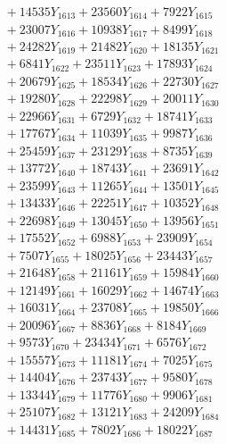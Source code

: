 \documentclass[a4paper,10pt]{article}
\begin{document}
{\begin{align}
&\;  + 14535 Y_{1613} + 23560 Y_{1614} + 7922 Y_{1615} \\[0.3ex]
&\;  + 23007 Y_{1616} + 10938 Y_{1617} + 8499 Y_{1618} \\[0.5ex]\allowbreak
&\;  + 24282 Y_{1619} + 21482 Y_{1620} + 18135 Y_{1621} \\[0.3ex]
&\;  + 6841 Y_{1622} + 23511 Y_{1623} + 17893 Y_{1624} \\[0.3ex]
&\;  + 20679 Y_{1625} + 18534 Y_{1626} + 22730 Y_{1627} \\[0.3ex]
&\;  + 19280 Y_{1628} + 22298 Y_{1629} + 20011 Y_{1630} \\[0.3ex]
&\;  + 22966 Y_{1631} + 6729 Y_{1632} + 18741 Y_{1633} \\[0.3ex]
&\;  + 17767 Y_{1634} + 11039 Y_{1635} + 9987 Y_{1636} \\[0.3ex]
&\;  + 25459 Y_{1637} + 23129 Y_{1638} + 8735 Y_{1639} \\[0.3ex]
&\;  + 13772 Y_{1640} + 18743 Y_{1641} + 23691 Y_{1642} \\[0.3ex]
&\;  + 23599 Y_{1643} + 11265 Y_{1644} + 13501 Y_{1645} \\[0.3ex]
&\;  + 13433 Y_{1646} + 22251 Y_{1647} + 10352 Y_{1648} \\[0.5ex]\allowbreak
&\;  + 22698 Y_{1649} + 13045 Y_{1650} + 13956 Y_{1651} \\[0.3ex]
&\;  + 17552 Y_{1652} + 6988 Y_{1653} + 23909 Y_{1654} \\[0.3ex]
&\;  + 7507 Y_{1655} + 18025 Y_{1656} + 23443 Y_{1657} \\[0.3ex]
&\;  + 21648 Y_{1658} + 21161 Y_{1659} + 15984 Y_{1660} \\[0.3ex]
&\;  + 12149 Y_{1661} + 16029 Y_{1662} + 14674 Y_{1663} \\[0.3ex]
&\;  + 16031 Y_{1664} + 23708 Y_{1665} + 19850 Y_{1666} \\[0.3ex]
&\;  + 20096 Y_{1667} + 8836 Y_{1668} + 8184 Y_{1669} \\[0.3ex]
&\;  + 9573 Y_{1670} + 23434 Y_{1671} + 6576 Y_{1672} \\[0.3ex]
&\;  + 15557 Y_{1673} + 11181 Y_{1674} + 7025 Y_{1675} \\[0.3ex]
&\;  + 14404 Y_{1676} + 23743 Y_{1677} + 9580 Y_{1678} \\[0.5ex]\allowbreak
&\;  + 13344 Y_{1679} + 11776 Y_{1680} + 9906 Y_{1681} \\[0.3ex]
&\;  + 25107 Y_{1682} + 13121 Y_{1683} + 24209 Y_{1684} \\[0.3ex]
&\;  + 14431 Y_{1685} + 7802 Y_{1686} + 18022 Y_{1687} \\[0.3ex]

\end{align}}
\end{document}
